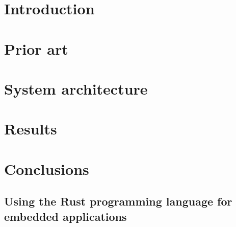 \documentclass[oneside]{ctuthesis}
\theoremstyle{plain}
\theoremstyle{definition}
\theoremstyle{note}
\begin{document}
\maketitle


\chapter{\label{chapter:introduction} Introduction}


\chapter{\label{chapter:prior} Prior art}


\chapter{\label{chapter:architecture} System architecture}


\chapter{\label{chapter:results} Results}



\chapter{Conclusions}


\printindex

\begin{appendices}
\chapter{Using the Rust programming language for embedded applications}

\end{appendices}





\end{document}
